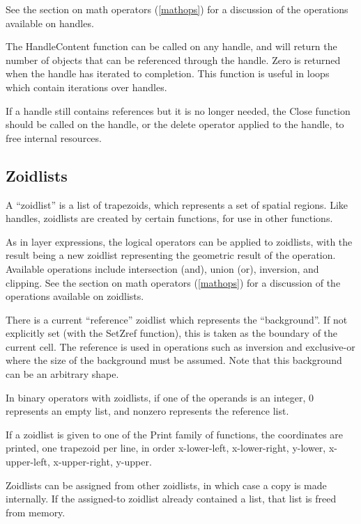 See the section on math operators (\ref{mathops}) for a discussion of
the operations available on handles.

The {\vt HandleContent} function can be called on any handle, and will
return the number of objects that can be referenced through the
handle.  Zero is returned when the handle has iterated to completion. 
This function is useful in loops which contain iterations over
handles.

If a handle still contains references but it is no longer needed, the
{\vt Close} function should be called on the handle, or the {\vt
delete} operator applied to the handle, to free internal resources.

\subsection{Zoidlists}

A ``zoidlist'' is a list of trapezoids, which represents a set of
spatial regions.  Like handles, zoidlists are created by certain
functions, for use in other functions.

As in layer expressions, the logical operators can be applied to
zoidlists, with the result being a new zoidlist representing the
geometric result of the operation.  Available operations include
intersection (and), union (or), inversion, and clipping.  See the
section on math operators (\ref{mathops}) for a discussion of the
operations available on zoidlists.

There is a current ``reference'' zoidlist which represents the
``background''.  If not explicitly set (with the {\vt SetZref}
function), this is taken as the boundary of the current cell.  The
reference is used in operations such as inversion and exclusive-or
where the size of the background must be assumed.  Note that this
background can be an arbitrary shape.

In binary operators with zoidlists, if one of the operands is an
integer, 0 represents an empty list, and nonzero represents the
reference list.

If a zoidlist is given to one of the {\vt Print} family of functions,
the coordinates are printed, one trapezoid per line, in order
x-lower-left, x-lower-right, y-lower, x-upper-left, x-upper-right,
y-upper.

Zoidlists can be assigned from other zoidlists, in which case a copy
is made internally.  If the assigned-to zoidlist already contained a
list, that list is freed from memory.

